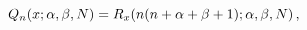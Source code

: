 \[\mathop{Q_{n}\/}\nolimits\!\left(x;\alpha,\beta,N\right)=\mathop{R_{x}\/}%
\nolimits\!\left(n(n+\alpha+\beta+1);\alpha,\beta,N\right),\]